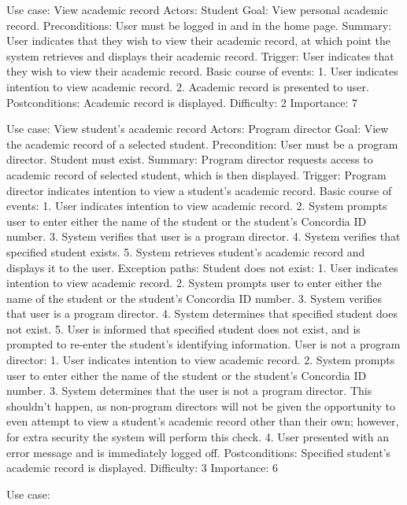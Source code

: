 \documentclass[12pt]{article}
\begin{document}
Use case: View academic record
Actors: Student
Goal: View personal academic record.
Preconditions: User must be logged in and in the home page.
Summary: User indicates that they wish to view their academic record, at which
point the system retrieves and displays their academic record.
Trigger: User indicates that they wish to view their academic record.
Basic course of events:
1. User indicates intention to view academic record.
2. Academic record is presented to user.
Postconditions: Academic record is displayed.
Difficulty: 2
Importance: 7


Use case: View student's academic record
Actors: Program director
Goal: View the academic record of a selected student.
Precondition: User must be a program director. Student must exist.
Summary: Program director requests access to academic record of selected student,
which is then displayed.
Trigger: Program director indicates intention to view a student's academic record.
Basic course of events:
1. User indicates intention to view academic record.
2. System prompts user to enter either the name of the student or the student's Concordia ID number.
3. System verifies that user is a program director.
4. System verifies that specified student exists.
5. System retrieves student's academic record and displays it to the user.
Exception paths:
Student does not exist:
1. User indicates intention to view academic record.
2. System prompts user to enter either the name of the student or the student's Concordia ID number.
3. System verifies that user is a program director.
4. System determines that specified student does not exist.
5. User is informed that specified student does not exist, and is prompted to re-enter
the student's identifying information.
User is not a program director:
1. User indicates intention to view academic record.
2. System prompts user to enter either the name of the student or the student's Concordia ID number.
3. System determines that the user is not a program director. This shouldn't happen, as
non-program directors will not be given the opportunity to even attempt to view
a student's academic record other than their own; however, for extra security the
system will perform this check.
4. User presented with an error message and is immediately logged off.
Postconditions: Specified student's academic record is displayed.
Difficulty: 3
Importance: 6


Use case: 
\end{document}
